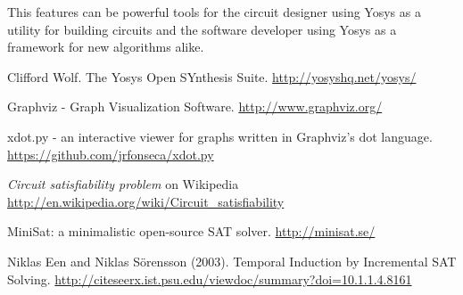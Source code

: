 \documentclass[9pt,technote,a4paper]{IEEEtran}
\begin{document}
This features can be powerful tools for the circuit designer using Yosys as a
utility for building circuits and the software developer using Yosys as a
framework for new algorithms alike.

\begin{thebibliography}{9}

Clifford Wolf. The Yosys Open SYnthesis Suite.
\url{http://yosyshq.net/yosys/}

Graphviz - Graph Visualization Software.
\url{http://www.graphviz.org/}

xdot.py - an interactive viewer for graphs written in Graphviz's dot language.
\url{https://github.com/jrfonseca/xdot.py}

{\it Circuit satisfiability problem} on Wikipedia
\url{http://en.wikipedia.org/wiki/Circuit_satisfiability}

MiniSat: a minimalistic open-source SAT solver.
\url{http://minisat.se/}

Niklas Een and Niklas S\"orensson (2003).
Temporal Induction by Incremental SAT Solving.
\url{http://citeseerx.ist.psu.edu/viewdoc/summary?doi=10.1.1.4.8161}

\end{thebibliography}
\end{document}
